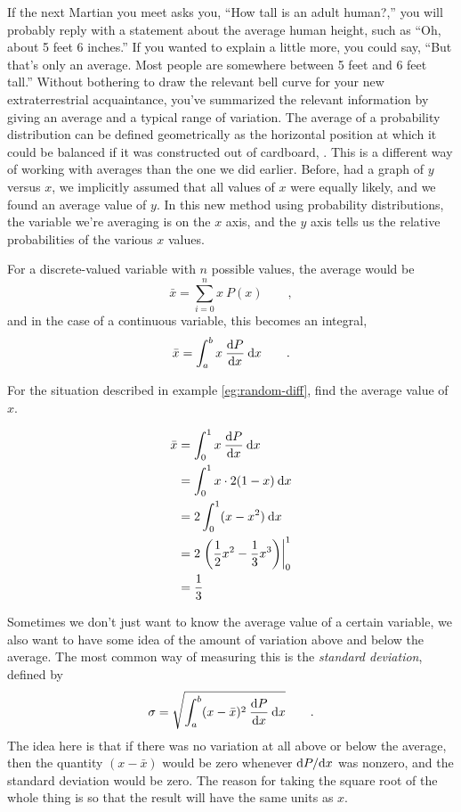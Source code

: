 If the next Martian you meet asks you, ``How tall is an
adult human?,'' you will probably reply with a statement
about the average human height, such as ``Oh, about 5 feet 6
inches.'' If you wanted to explain a little more, you could
say, ``But that's only an average. Most people are somewhere
between 5 feet and 6 feet tall.'' Without bothering to draw
the relevant bell curve for your new extraterrestrial
acquaintance, you've summarized the relevant information by
giving an average and a typical range of variation.
The average of a probability distribution can be defined
geometrically as the horizontal position at which it could
be balanced if it was constructed out of cardboard, .
This is a different way of working with averages than the one
we did earlier. Before, had a graph of $y$ versus $x$, we implicitly
assumed that all values of $x$ were equally likely, and we found an
average value of $y$. In this new method using probability distributions,
the variable we're averaging is on the $x$ axis, and the $y$ axis
tells us the relative probabilities of the various $x$ values.

For a discrete-valued variable with $n$ possible values, the average would be
\begin{equation*}
  \bar{x} = \sum_{i=0}^n x\:P(x) \qquad ,
\end{equation*}
and in the case of a continuous variable, this becomes an integral,
\begin{equation*}
  \bar{x} = \int_a^b x\:\frac{\textup{d} P}{\textup{d} x} \: \textup{d} x \qquad .
\end{equation*}

\begin{eg}
\egquestion For the situation described in example \ref{eg:random-diff},
find the average value of $x$.

\eganswer
\begin{align*}
  \bar{x} &= \int_0^1 x\:\frac{\textup{d} P}{\textup{d} x} \: \textup{d} x \\
          &= \int_0^1 x \cdot 2(1-x)\:\textup{d} x \\
          &= 2\int_0^1 (x-x^2)\:\textup{d} x \\
          &= 2\left. \left(\frac{1}{2}x^2-\frac{1}{3}x^3\right) \right|_0^1 \\
          &= \frac{1}{3}
\end{align*}
\end{eg}

Sometimes we don't just want to know the average value of a certain variable, we
also want to have some idea of the amount of variation above and below the average.
The most common way of measuring this is the \emph{standard deviation},
defined by
\begin{equation*}
  \sigma = \sqrt{\int_a^b (x-\bar{x})^2\:\frac{\textup{d} P}{\textup{d} x} \: \textup{d} x} \qquad .
\end{equation*}
The idea here is that if there was no variation at all above or below the average,
then the quantity $(x-\bar{x})$ would be zero whenever $\textup{d} P/\textup{d} x$ was nonzero, and
the standard deviation would be zero. The reason for taking the square root of the whole
thing is so that the result will have the same units as $x$.

